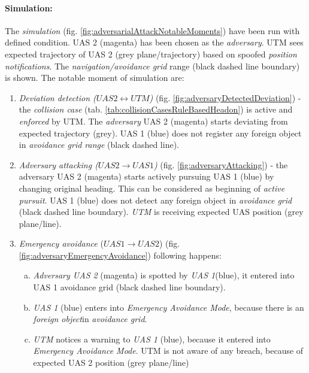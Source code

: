 \paragraph{Simulation:} The \emph{simulation} (fig. \ref{fig:adversarialAttackNotableMoments}) have been run with defined condition. UAS 2 (magenta) has been chosen as the \emph{adversary}. UTM sees expected trajectory of UAS 2 (grey plane/trajectory) based on spoofed \emph{position notifications}. The \emph{navigation/avoidance grid} range (black dashed line boundary) is shown. The notable moment of simulation are: 

\begin{enumerate}
    \item \emph{Deviation detection ($UAS2\leftrightarrow UTM$)} (fig. \ref{fig:adversaryDetectedDeviation}) - the \emph{collision case} (tab. \ref{tab:collisionCasesRuleBasedHeadon}) is active and \emph{enforced} by UTM. The \emph{adversary} UAS 2 (magenta) starts deviating from expected trajectory (grey). UAS 1 (blue) does not register any foreign object in \emph{avoidance grid range} (black dashed line). 
    
    \item \emph{Adversary attacking ($UAS 2 \to UAS 1$)} (fig. \ref{fig:adversaryAttacking}) - the adversary UAS 2 (magenta) starts actively pursuing UAS 1 (blue) by changing original heading. This can be considered as beginning of \emph{active pursuit}. UAS 1 (blue) does not detect any foreign object in \emph{avoidance grid} (black dashed line boundary). \emph{UTM} is receiving expected UAS position (grey plane/line).
    
    \item \emph{Emergency avoidance} ($UAS 1 \to UAS 2$) (fig. \ref{fig:adversaryEmergencyAvoidance}) following happens:
    \begin{enumerate}[a.]
        \item \emph{Adversary UAS 2} (magenta) is spotted by \emph{UAS 1}(blue), it entered into UAS 1 avoidance grid (black dashed line boundary).
        
        \item \emph{UAS 1} (blue) enters into \emph{Emergency Avoidance Mode}, because there is an \emph{foreign object}in \emph{avoidance grid}.
        
        \item \emph{UTM} notices a warning to \emph{UAS 1} (blue), because it entered into \emph{Emergency Avoidance Mode}. UTM is not aware of any breach, because of expected UAS 2 position (grey plane/line)
        

\end{enumerate}
\end{enumerate}
